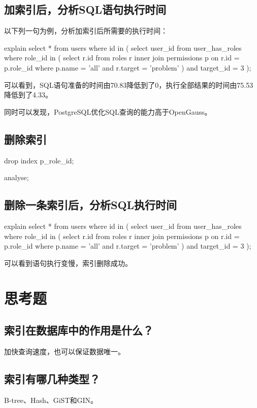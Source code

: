 \documentclass{ctexrep}
\begin{document}
\subsection{加索引后，分析SQL语句执行时间}
以下列一句为例，分析加索引后所需要的执行时间：
\begin{run}
    explain select * from users where id in (
        select user_id from user_has_roles where role_id in (
            select r.id from roles r 
            inner join permissions p on r.id = p.role_id 
            where p.name = 'all' and r.target = 'problem'
        ) and target_id = 3
    );
\end{run}
可以看到，SQL语句准备的时间由70.83降低到了0，执行全部结果的时间由75.53降低到了4.33。

同时可以发现，PostgreSQL优化SQL查询的能力高于OpenGauss。

\subsection{删除索引}
\begin{run}
    drop index p_role_id;
\end{run}
\begin{runsilent}
    analyse;
\end{runsilent}
\subsection{删除一条索引后，分析SQL执行时间}
\begin{run}
    explain select * from users where id in (
        select user_id from user_has_roles where role_id in (
            select r.id from roles r 
            inner join permissions p on r.id = p.role_id 
            where p.name = 'all' and r.target = 'problem'
        ) and target_id = 3
    );
\end{run}
可以看到语句执行变慢，索引删除成功。

\section{思考题}
\subsection*{索引在数据库中的作用是什么？}
加快查询速度，也可以保证数据唯一。
\subsection*{索引有哪几种类型？}
B-tree、Hash、GiST和GIN。
\end{document}
